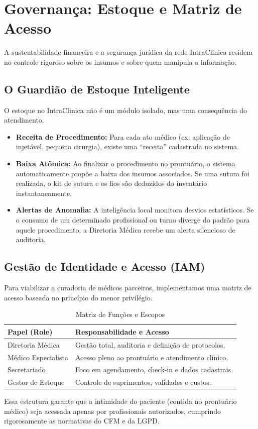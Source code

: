 \chapter{Governança: Estoque e Matriz de Acesso}

A sustentabilidade financeira e a segurança jurídica da rede IntraClinica residem no controle rigoroso sobre os insumos e sobre quem manipula a informação.

\section{O Guardião de Estoque Inteligente}

O estoque no IntraClinica não é um módulo isolado, mas uma consequência do atendimento.
\begin{itemize}
    \item \textbf{Receita de Procedimento:} Para cada ato médico (ex: aplicação de injetável, pequena cirurgia), existe uma ``receita'' cadastrada no sistema.
    \item \textbf{Baixa Atômica:} Ao finalizar o procedimento no prontuário, o sistema automaticamente propõe a baixa dos insumos associados. Se uma sutura foi realizada, o kit de sutura e os fios são deduzidos do inventário instantaneamente.
    \item \textbf{Alertas de Anomalia:} A inteligência local monitora desvios estatísticos. Se o consumo de um determinado profissional ou turno diverge do padrão para aquele procedimento, a Diretoria Médica recebe um alerta silencioso de auditoria.
\end{itemize}

\section{Gestão de Identidade e Acesso (IAM)}

Para viabilizar a curadoria de médicos parceiros, implementamos uma matriz de acesso baseada no princípio do menor privilégio.

\begin{table}[h!]
\centering
\caption{Matriz de Funções e Escopos}
\vspace{0.3cm}
\begin{tabular}{@{}ll@{}}
\toprule
\textbf{Papel (Role)} & \textbf{Responsabilidade e Acesso} \\ \midrule
Diretoria Médica & Gestão total, auditoria e definição de protocolos. \\
Médico Especialista & Acesso pleno ao prontuário e atendimento clínico. \\
Secretariado & Foco em agendamento, check-in e dados cadastrais. \\
Gestor de Estoque & Controle de suprimentos, validades e custos. \\ \bottomrule
\end{tabular}
\end{table}

Essa estrutura garante que a intimidade do paciente (contida no prontuário médico) seja acessada apenas por profissionais autorizados, cumprindo rigorosamente as normativas do CFM e da LGPD.
